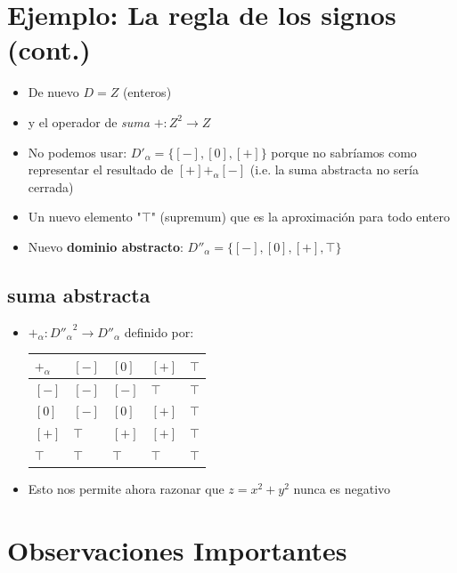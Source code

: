 \documentclass[11pt]{article}
\begin{document}
\section*{Ejemplo: La regla de los signos (cont.)}
\label{sec:org220eea4}

\begin{itemize}
\item De nuevo \(D = Z\) (enteros)
\item y el operador de \emph{suma} \(+ : Z^2 \to Z\)
\item No podemos usar: \(D'_\alpha = \{[-],[0],[+]\}\) porque no sabríamos
como representar el resultado de \([+] +_\alpha [-]\) (i.e. la suma
abstracta no sería cerrada)
\item Un nuevo elemento "\(\top\)" (supremum) que es la aproximación para todo entero
\item Nuevo \textbf{dominio abstracto}: \(D''_\alpha = \{[-],[0],[+],\top\}\)
\end{itemize}

\subsection*{suma abstracta}
\label{sec:org2d11930}
\begin{itemize}
\item \(+_\alpha : {D''_\alpha}^2 \to D''_\alpha\)
definido por: 
\begin{center}
\begin{tabular}{lllll}
\(+_\alpha\) & \([-]\) & \([0]\) & \([+]\) & \(\top\)\\
\hline
\([-]\) & \([-]\) & \([-]\) & \(\top\) & \(\top\)\\
\([0]\) & \([-]\) & \([0]\) & \([+]\) & \(\top\)\\
\([+]\) & \(\top\) & \([+]\) & \([+]\) & \(\top\)\\
\(\top\) & \(\top\) & \(\top\) & \(\top\) & \(\top\)\\
\hline
\end{tabular}
\end{center}
\item Esto nos permite ahora razonar que \(z=x^2 + y^2\) nunca es negativo
\end{itemize}


\section*{Observaciones Importantes}
\label{sec:orga60cb6b}
\end{document}
